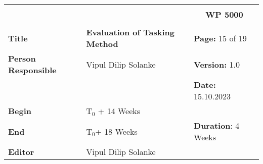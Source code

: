 \begin{table}[!h]
  \begin{center}
    \begin{tabular}{|p{35mm}||p{55mm}|p{50mm}||p{40mm}|}
      \hline
      \multicolumn{3}{|l||}{\textbf{}} & \multicolumn{1}{c|}{}                                                                                                                                                \\
      \multicolumn{3}{|l||}{\textbf{}} & \multicolumn{1}{c|}{\textbf{WP 5000}}                                                                                                                                \\
      \multicolumn{3}{|l||}{\textbf{}} & \multicolumn{1}{c|}{}                                                                                                                                                \\
      \hline\hline
      \textbf{Title}                   & \multicolumn{2}{p{7cm}||}{\textbf{Evaluation of Tasking Method}}
                                       & \textbf{Page:} 15 of 19                                                                                                                                              \\
      \hline
      \textbf{Person Responsible}        & \multicolumn{2}{l||}{Vipul Dilip Solanke}                                                                                                   & \textbf{Version:} 1.0   \\
      \hline
      \multicolumn{3}{|l||}{}          & \textbf{Date:} 15.10.2023                                                                                                                                          \\
      \hline\hline
      \textbf{Begin}                  & \multicolumn{2}{l||}{T$_0$ + 14 Weeks}                                                                                                                &                         \\
      \hline
      \textbf{End}                    & \multicolumn{2}{l||}{T$_0$+ 18 Weeks}                                                                                                        & \textbf{Duration}: 4 Weeks \\
      \hline\hline
      \textbf{Editor}              & \multicolumn{3}{l|}{Vipul Dilip Solanke}                                                                                                                              \\

\end{tabular}
\end{center}
\end{table}

